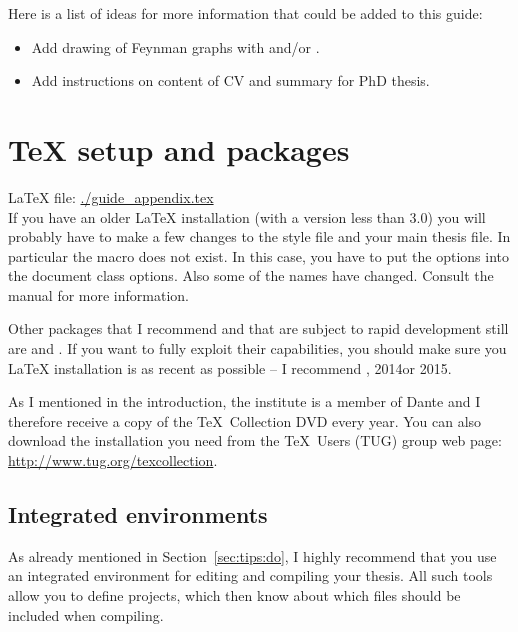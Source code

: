 Here is a list of ideas for more information that could be added to
this guide:
\begin{itemize}
\item Add drawing of Feynman graphs with  and/or
  .
\item Add instructions on content of CV and summary for PhD thesis.
\end{itemize}


\chapter{\TeX{} setup and packages}
\label{sec:app:tex}

\LaTeX{} file: \url{./guide_appendix.tex}\\[1ex]
\noindent
If you have an older \LaTeX{} installation (with a \KOMAScript{}
version less than 3.0) you will probably have to make a few changes to
the style file and your main thesis file.
In particular the  macro does not exist. In this case, you
have to put the options into the document class options. Also some of
the names have changed. Consult the \KOMAScript{} manual for more
information.

Other packages that I recommend and that are subject to rapid
development still are  and
. If you want to fully exploit their capabilities,
you should make sure you \LaTeX{} installation is as recent as
possible -- I recommend , 2014or 2015.

As I mentioned in the introduction, the institute is a member of Dante
and I therefore receive a copy of the \TeX\ Collection DVD every
year. You can also download the installation you need from the \TeX\
Users (TUG) group web page: \url{http://www.tug.org/texcollection}.


\section{Integrated environments}
\label{sec:app:compile}

As already mentioned in Section~\ref{sec:tips:do}, I highly recommend
that you use an integrated environment for editing and compiling your
thesis. All such tools allow you to define projects, which then know
about which files should be included when compiling.

